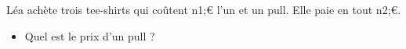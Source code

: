 \documentclass[exercice]{thedocument}%
\begin{document}
%
Léa achète trois tee-shirts qui coûtent {\<n1;\euro} l'un et un pull.
Elle paie en tout \<n2;\euro.
\begin{itemize}
    \item Quel est le prix d'un pull ?
\end{itemize}
\end{document}
